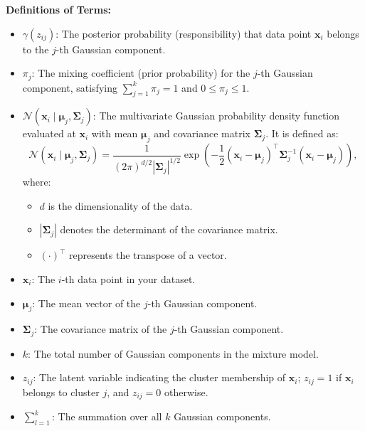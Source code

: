 \documentclass{article}
\begin{document}
\textbf{Definitions of Terms:}

\begin{itemize}
    \item \(\gamma(z_{ij})\): The posterior probability (responsibility) that data point \(\mathbf{x}_i\) belongs to the \(j\)-th Gaussian component.
    \item \(\pi_j\): The mixing coefficient (prior probability) for the \(j\)-th Gaussian component, satisfying \(\sum_{j=1}^{k} \pi_j = 1\) and \(0 \leq \pi_j \leq 1\).
    \item \(\mathcal{N}(\mathbf{x}_i \mid \boldsymbol{\mu}_j, \boldsymbol{\Sigma}_j)\): The multivariate Gaussian probability density function evaluated at \(\mathbf{x}_i\) with mean \(\boldsymbol{\mu}_j\) and covariance matrix \(\boldsymbol{\Sigma}_j\). It is defined as:
    \begin{equation}
    \mathcal{N}(\mathbf{x}_i \mid \boldsymbol{\mu}_j, \boldsymbol{\Sigma}_j) = \frac{1}{(2\pi)^{d/2} |\boldsymbol{\Sigma}_j|^{1/2}} \exp\left( -\frac{1}{2} (\mathbf{x}_i - \boldsymbol{\mu}_j)^\top \boldsymbol{\Sigma}_j^{-1} (\mathbf{x}_i - \boldsymbol{\mu}_j) \right),
    \end{equation}
    where:
    \begin{itemize}
        \item \(d\) is the dimensionality of the data.
        \item \(|\boldsymbol{\Sigma}_j|\) denotes the determinant of the covariance matrix.
        \item \((\cdot)^\top\) represents the transpose of a vector.
    \end{itemize}
    \item \(\mathbf{x}_i\): The \(i\)-th data point in your dataset.
    \item \(\boldsymbol{\mu}_j\): The mean vector of the \(j\)-th Gaussian component.
    \item \(\boldsymbol{\Sigma}_j\): The covariance matrix of the \(j\)-th Gaussian component.
    \item \(k\): The total number of Gaussian components in the mixture model.
    \item \(z_{ij}\): The latent variable indicating the cluster membership of \(\mathbf{x}_i\); \(z_{ij} = 1\) if \(\mathbf{x}_i\) belongs to cluster \(j\), and \(z_{ij} = 0\) otherwise.
    \item \(\sum_{l=1}^{k}\): The summation over all \(k\) Gaussian components.
\end{itemize}
\end{document}
